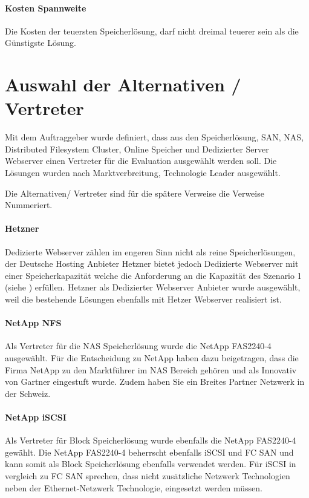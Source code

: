 \paragraph{Kosten Spannweite}\label{KO-3}
Die Kosten der teuersten Speicherlösung, darf nicht dreimal teuerer sein als die Günstigste Lösung.

\section{Auswahl der Alternativen / Vertreter}
Mit dem Auftraggeber wurde definiert, dass aus den Speicherlösung, SAN, NAS, Distributed Filesystem Cluster, Online Speicher und Dedizierter Server Webserver einen Vertreter für die Evaluation ausgewählt werden soll. Die Lösungen wurden nach Marktverbreitung, Technologie Leader ausgewählt.

Die Alternativen/ Vertreter sind für die spätere Verweise die Verweise Nummeriert.

\setcounter{paragraph}{0}
\renewcommand\theparagraph{Al-\arabic{paragraph}}
\paragraph{Hetzner}\label{Al-1}
Dedizierte Webserver zählen im engeren Sinn nicht als reine Speicherlösungen, der Deutsche Hosting Anbieter Hetzner bietet jedoch Dedizierte Webserver mit einer Speicherkapazität welche die Anforderung an die Kapazität des Szenario 1 (siehe ) erfüllen. Hetzner als Dedizierter Webserver Anbieter wurde ausgewählt, weil die bestehende Lösungen ebenfalls mit Hetzer Webserver realisiert ist. 

\paragraph{NetApp NFS}\label{Al-2}
Als Vertreter für die NAS Speicherlösung wurde die NetApp FAS2240-4 ausgewählt. Für die Entscheidung zu NetApp haben dazu beigetragen, dass die Firma NetApp zu den Marktführer im NAS Bereich gehören und als Innovativ von Gartner eingestuft wurde. Zudem haben Sie ein Breites Partner Netzwerk in der Schweiz.

\paragraph{NetApp iSCSI}\label{Al-3}
Als Vertreter für Block Speicherlösung wurde ebenfalls die NetApp FAS2240-4 gewählt. Die NetApp FAS2240-4 beherrscht ebenfalls iSCSI und FC SAN und kann somit als Block Speicherlösung ebenfalls verwendet werden. Für iSCSI in vergleich zu FC SAN sprechen, dass nicht zusätzliche Netzwerk Technologien neben der Ethernet-Netzwerk Technologie, eingesetzt werden müssen.

